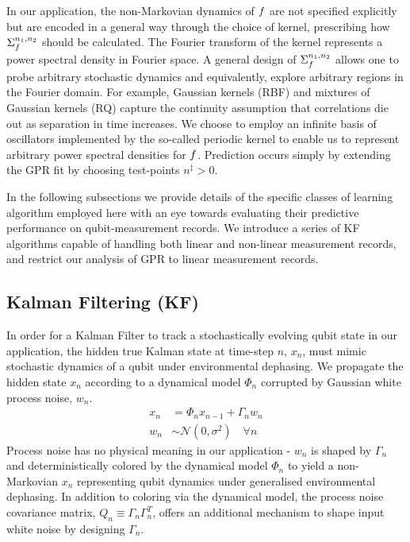 In our application, the non-Markovian dynamics of $f$ are not specified explicitly but are encoded in a general way through the choice of kernel, prescribing how $\Sigma_f^{n_1, n_2}$ should be calculated. The Fourier transform of the kernel represents a power spectral density in Fourier space. A general design of $\Sigma_f^{n_1, n_2}$ allows one to probe arbitrary stochastic dynamics and equivalently, explore arbitrary regions in the Fourier domain. For example, Gaussian kernels (RBF) and mixtures of Gaussian kernels (RQ) capture the continuity assumption that correlations die out as separation in time increases. We choose to employ an infinite basis of oscillators implemented by the so-called periodic kernel to enable us to represent arbitrary power spectral densities for $f$.  Prediction occurs simply by extending the GPR fit by choosing test-points $n^{\ddagger}>0$.

In the following subsections we provide details of the specific classes of learning algorithm employed here with an eye towards evaluating their predictive performance on qubit-measurement records.  We introduce a series of KF algorithms capable of handling both linear and non-linear measurement records, and restrict our analysis of GPR to linear measurement records. 



\subsection{ Kalman Filtering (KF)}\label{Subsec:KF}

In order for a Kalman Filter to track a stochastically evolving qubit state in our application, the hidden true Kalman state at time-step $n$, $x_n$, must mimic stochastic dynamics of a qubit under environmental dephasing. We propagate the hidden state $x_n$ according to a dynamical model $\Phi_n$ corrupted by Gaussian white process noise, $w_n$.  
\begin{align}
	x_n & = \Phi_n x_{n-1} + \Gamma_n w_n \label{eqn:KF:dynamics} \\
	w_n & \sim \mathcal{N}(0, \sigma^2) \quad \forall n 
\end{align}
Process noise has no physical meaning in our application - $w_n$ is shaped by $\Gamma_n$ and deterministically colored by the dynamical model $\Phi_n$ to yield a non-Markovian $x_n$ representing qubit dynamics under generalised environmental dephasing. In addition to coloring via the dynamical model, the process noise covariance matrix, $Q_n \equiv \Gamma_n\Gamma_n^T $, offers an additional mechanism to shape input white noise by designing $\Gamma_n$.

